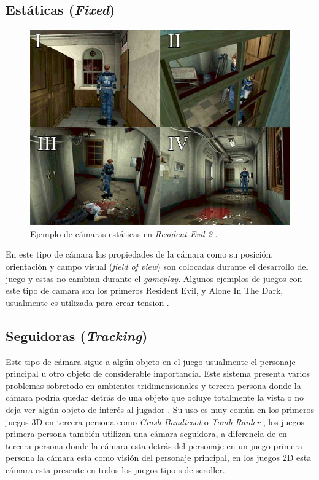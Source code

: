 \subsection{Estáticas (\emph{Fixed})}
\begin{figure}
\includegraphics[width=\linewidth]{semana2/resident_evil_camerawork.jpg} 
\caption{Ejemplo de cámaras estáticas en \emph{Resident Evil 2} \cite{fixed_camera} \cite{residentevil2}.}
\end{figure}
En este tipo de cámara las propiedades de la cámara como su posición, orientación y campo visual (\emph{field of view}) son colocadas durante el desarrollo del juego y estas no cambian durante el \emph{gameplay}. Algunos ejemplos de juegos con este tipo de camara son los primeros Resident Evil, y Alone In The Dark, usualmente es utilizada para crear tension \cite{res5_review}\cite{fixed_camera}.
\subsection{Seguidoras (\emph{Tracking})}
Este tipo de cámara sigue a algún objeto en el juego usualmente el personaje principal u otro objeto de considerable importancia. Este sistema presenta varios problemas sobretodo en ambientes tridimensionales y tercera persona donde la cámara podría quedar detrás de una objeto que ocluye totalmente la vista o no deja ver algún objeto de interés al jugador \cite{fund_gamedesign}. Su uso es muy común en los primeros juegos 3D en tercera persona como \emph{Crash Bandicoot} \cite{crashbandicoot} o \emph{Tomb Raider} \cite[p.~39]{bobbatesgamedesign}, los juegos primera persona también utilizan una cámara seguidora, a diferencia de en tercera persona donde la cámara esta detrás del personaje en un juego primera persona la cámara esta como visión del personaje principal, en los juegos 2D esta cámara esta presente en todos los juegos tipo side-scroller.
\newpage
